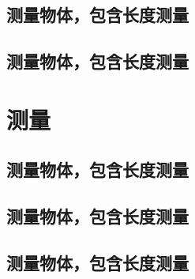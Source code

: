 


\begin{Quiz}

\section{测量物体，包含长度测量}

\section{测量物体，包含长度测量}

\chapter{测量}

\section{测量物体，包含长度测量}

\section{测量物体，包含长度测量}

\section{测量物体，包含长度测量}

\end{Quiz}




